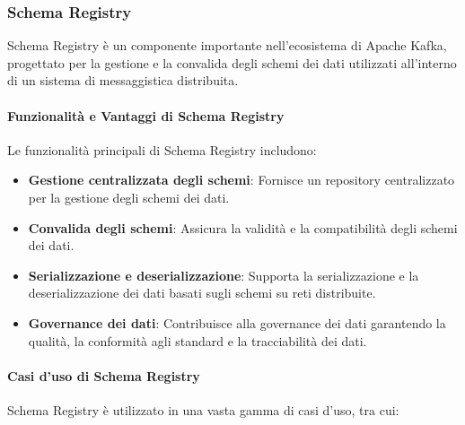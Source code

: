 \subsubsection{Schema Registry}
Schema Registry è un componente importante nell'ecosistema di Apache Kafka, progettato per la gestione e la convalida degli schemi dei dati utilizzati all'interno di un sistema di messaggistica distribuita.

\paragraph{Funzionalità e Vantaggi di Schema Registry}
Le funzionalità principali di Schema Registry includono:
\begin{itemize}
    \item \textbf{Gestione centralizzata degli schemi}: Fornisce un repository centralizzato per la gestione degli schemi dei dati.
    \item \textbf{Convalida degli schemi}: Assicura la validità e la compatibilità degli schemi dei dati.
    \item \textbf{Serializzazione e deserializzazione}: Supporta la serializzazione e la deserializzazione dei dati basati sugli schemi su reti distribuite.
    \item \textbf{Governance dei dati}: Contribuisce alla governance dei dati garantendo la qualità, la conformità agli standard e la tracciabilità dei dati.
\end{itemize}

\paragraph{Casi d'uso di Schema Registry}

Schema Registry è utilizzato in una vasta gamma di casi d'uso, tra cui:

